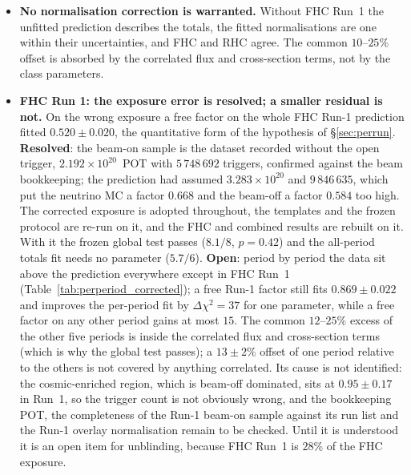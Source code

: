 \documentclass[11pt,a4paper]{article}
\begin{document}
\begin{itemize}\itemsep2pt
  \item \textbf{No normalisation correction is warranted.} Without FHC Run~1 the unfitted prediction describes the
    totals, the fitted normalisations are one within their uncertainties, and FHC and RHC agree. The common
    $10$--$25\%$ offset is absorbed by the correlated flux and cross-section terms, not by the class parameters.
  \item \textbf{FHC Run 1: the exposure error is resolved; a smaller residual is not.} On the wrong
    exposure a free factor on the whole FHC Run-1 prediction fitted $0.520\pm0.020$, the quantitative form of the
    hypothesis of \S\ref{sec:perrun}. \textbf{Resolved}: the beam-on sample is the dataset recorded without the
    open trigger, $2.192\times10^{20}$~POT with $5\,748\,692$ triggers, confirmed against the beam bookkeeping; the
    prediction had assumed $3.283\times10^{20}$ and $9\,846\,635$, which put the neutrino MC a factor $0.668$ and
    the beam-off a factor $0.584$ too high. The corrected exposure is adopted throughout, the templates and the
    frozen protocol are re-run on it, and the FHC and combined results are rebuilt on it. With it the frozen global
    test passes ($8.1/8$, $p=0.42$) and the all-period totals fit needs no parameter ($5.7/6$). \textbf{Open}: period
    by period the data sit above the prediction everywhere except in FHC Run~1
    (Table~\ref{tab:perperiod_corrected}); a free Run-1 factor still fits $0.869\pm0.022$ and improves the
    per-period fit by $\Delta\chi^2=37$ for one parameter, while a free factor on any other period gains at most
    $15$. The common $12$--$25\%$ excess of the other five periods is inside the correlated flux and
    cross-section terms (which is why the global test passes); a $13\pm2\%$ offset of one period relative to the
    others is not covered by anything correlated. Its cause is not identified: the cosmic-enriched region, which is
    beam-off dominated, sits at $0.95\pm0.17$ in Run~1, so the trigger count is not obviously wrong, and the
    bookkeeping POT, the completeness of the Run-1 beam-on sample against its run list and the Run-1 overlay
    normalisation remain to be checked. Until it is understood it is an open item for unblinding, because FHC
    Run~1 is $28\%$ of the FHC exposure.


\end{itemize}
\end{document}
